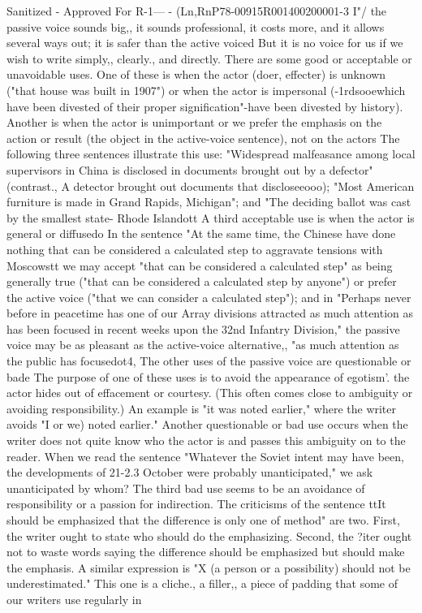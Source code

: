 \documentclass[
    oneside,
    11pt,
    draft
]{memoir}
\begin{document}
Sanitized - Approved For R-1--- - (Ln,RnP78-00915R001400200001-3 I"/ the passive voice sounds big,, it sounds professional, it costs more, and it allows several ways out; it is safer than the active voiced But it is no voice for us if we wish to write simply,, clearly., and directly. There are some good or acceptable or unavoidable uses. One of these is when the actor (doer, effecter) is unknown ("that house was built in 1907") or when the actor is impersonal (-1rdsooewhich have been divested of their proper signification"-have been divested by history). Another is when the actor is unimportant or we prefer the emphasis on the action or result (the object in the active-voice sentence), not on the actors The following three sentences illustrate this use: "Widespread malfeasance among local supervisors in China is disclosed in documents brought out by a defector" (contrast., A detector brought out documents that discloseeooo); "Most American furniture is made in Grand Rapids, Michigan"; and "The deciding ballot was cast by the smallest state- Rhode Islandott A third acceptable use is when the actor is general or diffusedo In the sentence "At the same time, the Chinese have done nothing that can be considered a calculated step to aggravate tensions with Moscowstt we may accept "that can be considered a calculated step" as being generally true ("that can be considered a calculated step by anyone") or prefer the active voice ("that we can consider a calculated step"); and in "Perhaps never before in peacetime has one of our Array divisions attracted as much attention as has been focused in recent weeks upon the 32nd Infantry Division," the passive voice may be as pleasant as the active-voice alternative,, "as much attention as the public has focusedot4, The other uses of the passive voice are questionable or bade The purpose of one of these uses is to avoid the appearance of egotism'. the actor hides out of effacement or courtesy. (This often comes close to ambiguity or avoiding responsibility.) An example is "it was noted earlier," where the writer avoids "I or we) noted earlier." Another questionable or bad use occurs when the writer does not quite know who the actor is and passes this ambiguity on to the reader. When we read the sentence "Whatever the Soviet intent may have been, the developments of 21-2.3 October were probably unanticipated," we ask unanticipated by whom? The third bad use seems to be an avoidance of responsibility or a passion for indirection. The criticisms of the sentence ttIt should be emphasized that the difference is only one of method" are two. First, the writer ought to state who should do the emphasizing. Second, the ?iter ought not to waste words saying the difference should be emphasized but should make the emphasis. A similar expression is "X (a person or a possibility) should not be underestimated." This one is a cliche., a filler,, a piece of padding that some of our writers use regularly in
\end{document}
